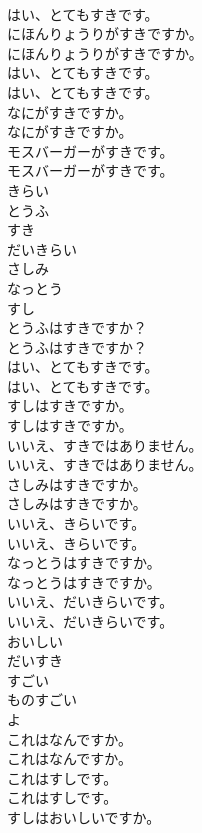 \documentclass[8pt]{extreport}
\begin{document}
\begin{CJK}{UTF8}{min}
\\	はい、とてもすきです。 
\\	にほんりょうりがすきですか。	
\\	にほんりょうりがすきですか。 
\\	はい、とてもすきです。	
\\	はい、とてもすきです。 
\\	なにがすきですか。	
\\	なにがすきですか。 
\\	モスバーガーがすきです。	
\\	モスバーガーがすきです。 
\\	きらい
\\	とうふ
\\	すき
\\	だいきらい
\\	さしみ
\\	なっとう
\\	すし
\\	とうふはすきですか？	
\\	とうふはすきですか？ 
\\	はい、とてもすきです。	
\\	はい、とてもすきです。 
\\	すしはすきですか。	
\\	すしはすきですか。 
\\	いいえ、すきではありません。	
\\	いいえ、すきではありません。 
\\	さしみはすきですか。	
\\	さしみはすきですか。 
\\	いいえ、きらいです。	
\\	いいえ、きらいです。 
\\	なっとうはすきですか。	
\\	なっとうはすきですか。 
\\	いいえ、だいきらいです。	
\\	いいえ、だいきらいです。 
\\	おいしい
\\	だいすき
\\	すごい
\\	ものすごい
\\	よ
\\	これはなんですか。	
\\	これはなんですか。 
\\	これはすしです。	
\\	これはすしです。 
\\	すしはおいしいですか。	

\end{CJK}
\end{document}
